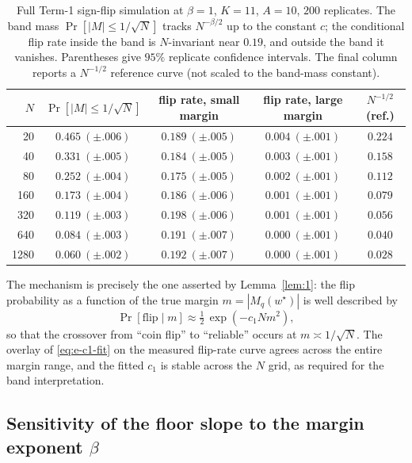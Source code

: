 \documentclass{article} %
\providecommand{\wstar}{w^{\star}}
\begin{document}
\begin{table}[t]
\centering
\small
\begin{tabular}{rcccc}
\toprule
$N$ & $\Pr[|M|\le 1/\sqrt N]$ & flip rate, small margin & flip rate, large margin & $N^{-1/2}$ (ref.) \\
\midrule
20   & $0.465\ (\pm.006)$ & $0.189\ (\pm.005)$ & $0.004\ (\pm.001)$ & $0.224$ \\
40   & $0.331\ (\pm.005)$ & $0.184\ (\pm.005)$ & $0.003\ (\pm.001)$ & $0.158$ \\
80   & $0.252\ (\pm.004)$ & $0.175\ (\pm.005)$ & $0.002\ (\pm.001)$ & $0.112$ \\
160  & $0.173\ (\pm.004)$ & $0.186\ (\pm.006)$ & $0.001\ (\pm.001)$ & $0.079$ \\
320  & $0.119\ (\pm.003)$ & $0.198\ (\pm.006)$ & $0.001\ (\pm.001)$ & $0.056$ \\
640  & $0.084\ (\pm.003)$ & $0.191\ (\pm.007)$ & $0.000\ (\pm.001)$ & $0.040$ \\
1280 & $0.060\ (\pm.002)$ & $0.192\ (\pm.007)$ & $0.000\ (\pm.001)$ & $0.028$ \\
\bottomrule
\end{tabular}
\caption{Full Term-1 sign-flip simulation at $\beta=1$, $K=11$, $A=10$,
$200$ replicates.  The band mass $\Pr[|M|\le 1/\sqrt N]$ tracks $N^{-\beta/2}$
up to the constant $c$; the conditional flip rate inside the band is
$N$-invariant near $0.19$, and outside the band it vanishes.  Parentheses give
$95\%$ replicate confidence intervals.  The final column reports a
$N^{-1/2}$ reference curve (not scaled to the band-mass constant).}
\label{tab:app-c1}
\end{table}

The mechanism is precisely the one asserted by Lemma~\ref{lem:1}: the flip
probability as a function of the true margin $m=|M_q(\wstar)|$ is well
described by
\begin{equation}
\label{eq:e-c1-fit}
\Pr[\text{flip}\mid m]\approx \tfrac12\,\exp\!\left(-c_1 N m^2\right),
\end{equation}
so that the crossover from ``coin flip'' to ``reliable'' occurs at
$m\asymp 1/\sqrt N$.  The overlay of \eqref{eq:e-c1-fit} on the measured
flip-rate curve agrees across the entire margin range, and the fitted
$c_1$ is stable across the $N$ grid, as required for the band interpretation.

\subsection{Sensitivity of the floor slope to the margin exponent
\texorpdfstring{$\beta$}{beta}}
\label{app:exp-slope}
\end{document}
